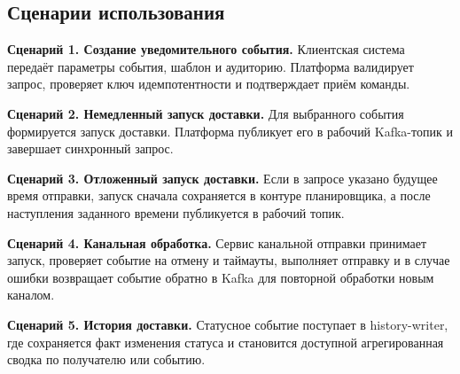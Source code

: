 \subsection{Сценарии использования}

\textbf{Сценарий 1. Создание уведомительного события.}
Клиентская система передаёт параметры события, шаблон и аудиторию. Платформа валидирует запрос, проверяет ключ идемпотентности и подтверждает приём команды.

\textbf{Сценарий 2. Немедленный запуск доставки.}
Для выбранного события формируется запуск доставки. Платформа публикует его в рабочий Kafka-топик и завершает синхронный запрос.

\textbf{Сценарий 3. Отложенный запуск доставки.}
Если в запросе указано будущее время отправки, запуск сначала сохраняется в контуре планировщика, а после наступления заданного времени публикуется в рабочий топик.

\textbf{Сценарий 4. Канальная обработка.}
Сервис канальной отправки принимает запуск, проверяет событие на отмену и таймауты, выполняет отправку и в случае ошибки возвращает событие обратно в Kafka для повторной обработки новым каналом.

\textbf{Сценарий 5. История доставки.}
Статусное событие поступает в history-writer, где сохраняется факт изменения статуса и становится доступной агрегированная сводка по получателю или событию.
